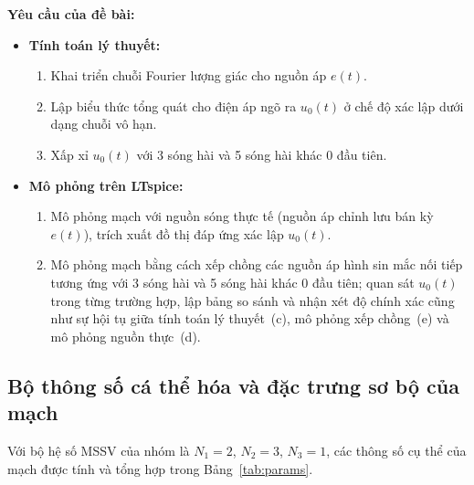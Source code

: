 \textbf{Yêu cầu của đề bài:}
\begin{itemize}
    \item \textbf{Tính toán lý thuyết:}
    \begin{enumerate}
        \item[(a)] Khai triển chuỗi Fourier lượng giác cho nguồn áp $e(t)$.
        \item[(b)] Lập biểu thức tổng quát cho điện áp ngõ ra $u_0(t)$ ở chế độ xác lập dưới dạng chuỗi vô hạn.
        \item[(c)] Xấp xỉ $u_0(t)$ với 3 sóng hài và 5 sóng hài khác $0$ đầu tiên.
    \end{enumerate}
    \item \textbf{Mô phỏng trên LTspice:}
    \begin{enumerate}
        \item[(d)] Mô phỏng mạch với nguồn sóng thực tế (nguồn áp chỉnh lưu bán kỳ $e(t)$), trích xuất đồ thị đáp ứng xác lập $u_0(t)$.
        \item[(e)] Mô phỏng mạch bằng cách xếp chồng các nguồn áp hình sin mắc nối tiếp tương ứng với 3 sóng hài và 5 sóng hài khác $0$ đầu tiên; quan sát $u_0(t)$ trong từng trường hợp, lập bảng so sánh và nhận xét độ chính xác cũng như sự hội tụ giữa tính toán lý thuyết~(c), mô phỏng xếp chồng~(e) và mô phỏng nguồn thực~(d).
    \end{enumerate}
\end{itemize}

\subsection{Bộ thông số cá thể hóa và đặc trưng sơ bộ của mạch}
Với bộ hệ số MSSV của nhóm là $N_1 = 2$, $N_2 = 3$, $N_3 = 1$, các thông số cụ thể của mạch được tính và tổng hợp trong Bảng~\ref{tab:params}.

